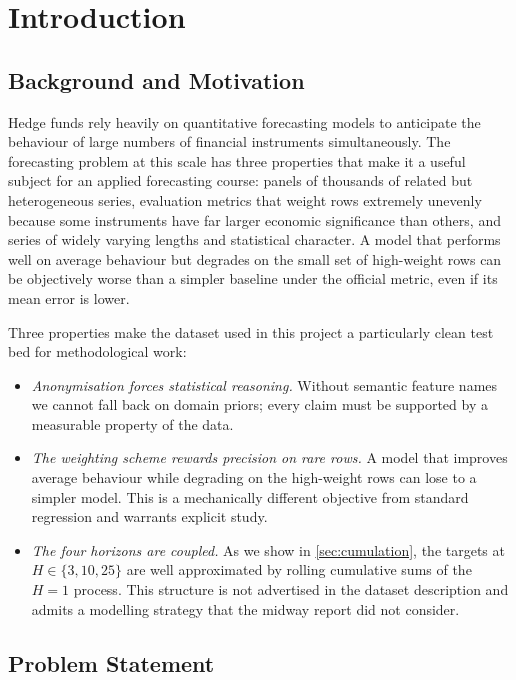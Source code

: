 \section{Introduction}
\label{sec:problem}

\subsection{Background and Motivation}
\label{sec:intro:background}

Hedge funds rely heavily on quantitative forecasting models to anticipate the behaviour of large numbers of financial instruments simultaneously. The forecasting problem at this scale has three properties that make it a useful subject for an applied forecasting course: panels of thousands of related but heterogeneous series, evaluation metrics that weight rows extremely unevenly because some instruments have far larger economic significance than others, and series of widely varying lengths and statistical character. A model that performs well on average behaviour but degrades on the small set of high-weight rows can be objectively worse than a simpler baseline under the official metric, even if its mean error is lower.

Three properties make the dataset used in this project a particularly clean test bed for methodological work:

\begin{itemize}
  \item \emph{Anonymisation forces statistical reasoning.} Without semantic feature names we cannot fall back on domain priors; every claim must be supported by a measurable property of the data.
  \item \emph{The weighting scheme rewards precision on rare rows.} A model that improves average behaviour while degrading on the high-weight rows can lose to a simpler model. This is a mechanically different objective from standard regression and warrants explicit study.
  \item \emph{The four horizons are coupled.} As we show in \cref{sec:cumulation}, the targets at $H \in \{3,10,25\}$ are well approximated by rolling cumulative sums of the $H=1$ process. This structure is not advertised in the dataset description and admits a modelling strategy that the midway report did not consider.
\end{itemize}

\subsection{Problem Statement}
\label{sec:intro:problem}

